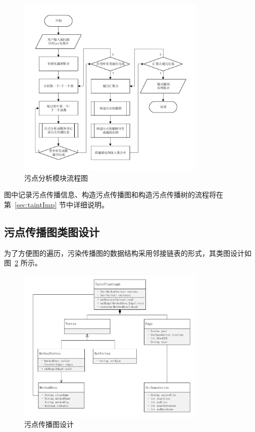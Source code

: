\begin{figure}[!htb]
	\centering
	\includegraphics[width=0.8\textwidth]{FIGs/chapter3/taintprocessing.pdf}
	\caption{污点分析模块流程图}\label{taintprocess}
\end{figure}

图中记录污点传播信息、构造污点传播图和构造污点传播树的流程将在第~\ref{sec:taintImp} 节中详细说明。

\subsection{污点传播图类图设计}

为了方便图的遍历，污染传播图的数据结构采用邻接链表的形式，其类图设计如图~\ref{taintGraphClass} 所示。

\begin{figure}[!htb]
	\centering
	\includegraphics[width=0.8\textwidth]{FIGs/chapter3/taintGraphClass.pdf}
	\caption{污点传播图设计}\label{taintGraphClass}
\end{figure}

